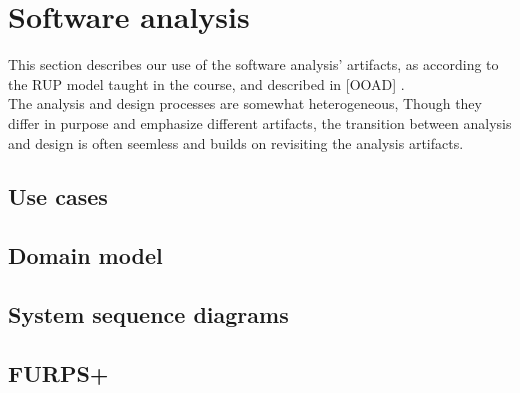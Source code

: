 \section{Software analysis}
\label{sec:software-analysis}
This section describes our use of the software analysis' artifacts, as according to the RUP model taught in the course, and described in [OOAD] \cite{Larman2011}.\\
The analysis and design processes are somewhat heterogeneous, Though they differ in purpose and emphasize different artifacts, the transition between analysis and design is often seemless and builds on revisiting the analysis artifacts.

\subsection{Use cases}


\subsection{Domain model}


\subsection{System sequence diagrams}


\subsection{FURPS+}

